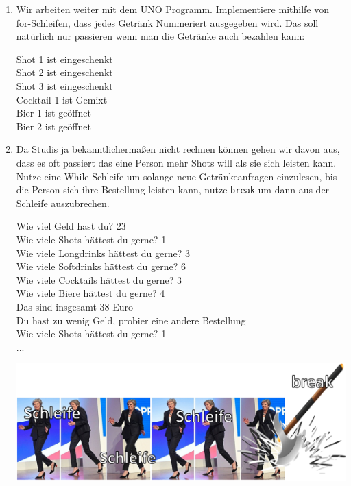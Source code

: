 \documentclass{../../sheet}
\begin{document}
\newpage
{}
\begin{enumerate}
    \item Wir arbeiten weiter mit dem UNO Programm. Implementiere mithilfe von for-Schleifen, dass jedes Getränk Nummeriert ausgegeben wird. Das soll natürlich nur passieren wenn man die Getränke auch bezahlen kann:
          \begin{ausgabe}
              Shot 1 ist  eingeschenkt\\
              Shot 2 ist  eingeschenkt\\
              Shot 3 ist  eingeschenkt\\
              Cocktail 1 ist  Gemixt\\
              Bier 1 ist geöffnet\\
              Bier 2 ist geöffnet
          \end{ausgabe}
    \item Da Studis ja bekanntlichermaßen nicht rechnen können gehen wir davon aus, dass es oft passiert das eine Person mehr Shots will als sie sich leisten kann. Nutze eine While Schleife um solange neue Getränkeanfragen einzulesen, bis die Person sich ihre Bestellung leisten kann, nutze \texttt{break} um dann aus der Schleife auszubrechen.
    \begin{ausgabe}
        Wie viel Geld hast du? 23\\
        Wie viele Shots hättest du gerne? 1\\
        Wie viele Longdrinks hättest du gerne? 3\\
        Wie viele Softdrinks hättest du gerne? 6\\
        Wie viele Cocktails hättest du gerne? 3\\
        Wie viele Biere hättest du gerne? 4\\
        Das sind insgesamt 38 Euro\\
        Du hast zu wenig Geld, probier eine andere Bestellung\\
        Wie viele Shots hättest du gerne? 1\\
        ...
    \end{ausgabe}

    \includegraphics[width=1\linewidth]{../../memes/breakohnerand.png}
    

\end{enumerate}
\end{document}
